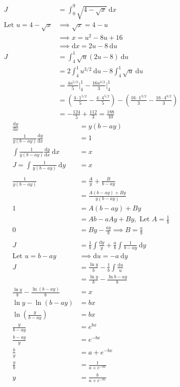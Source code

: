 \documentclass{article}
\theoremstyle{plain}
\theoremstyle{definition}
\newcommand{\dx}{\text{d}}
\begin{document}
\begin{align*}
	J&=\int_0^9 \sqrt{4-\sqrt{x}}\ \text{d}x \\
	\text{Let } u = 4-\sqrt{x} &\implies \sqrt{x} =4-u \\
							   &\implies x = u^2-8u+16 \\
							   &\implies \text{d}x = 2u-8\ \text{d}u\\
	J&= \int_4^1 \sqrt{u}(2u-8)\ \text{d}u \\
	 &= 2\int_4^1 u^{3/2}\ \text{d}u - 8 \int_4^1 \sqrt{u} \ \text{d}u \\
	 &= \frac{4u^{5/2}}{5} \bigg|_4^1- \frac{16u^{3/2}}{3} \bigg|_4^1\\
	 &= \left(\frac{4\cdot 1^{5/2}}{5}-\frac{4\cdot 4^{5/2}}{5}\right)
	-\left(\frac{16\cdot 1^{3/2}}{3}-\frac{16\cdot 4^{3/2}}{3}\right)\\
	&= -\frac{124}{5} + \frac{112}{3} = \frac{188}{10}
\end{align*}
\begin{align*}
	\frac{\dx y}{\dx x} &= y(b-ay) \\
	\frac{1}{y(b-ay)}\frac{\dx y}{\dx x} &= 1 \\
	\int \frac{1}{y(b-ay)}\frac{\dx y}{\dx x}\ \dx x &= x \\
	J=\int \frac{1}{y(b-ay)}\ \dx y &= x \\
	\\
	\frac{1}{y(b-ay)} &= \frac{A}{y}+\frac{B}{b-ay} \\
					  &= \frac{A(b-ay)+By}{y(b-ay)}\\
					1 &= A(b-ay)+By \\
					  &= Ab - aAy+By, \text{ Let } A =\frac{1}{b} \\
					0 &= By-\frac{ay}{b} \implies B = \frac{a}{b} \\
	\\
	J&= \frac{1}{b}\int\frac{\dx y}{y}+\frac{a}{b}\int\frac{1}{b-ay}\ \dx y \\
	\text{Let } u = b-ay &\implies \dx u = -a\ \dx y \\
	J&= \frac{\ln y}{b}-\frac{1}{b}\int\frac{\dx u}{u} \\
	 &= \frac{\ln y}{b}-\frac{\ln b-ay}{b}\\
	\frac{\ln y}{b}-\frac{\ln( b-ay)}{b} &= x \\
	\ln y - \ln (b-ay) &= bx\\
	\ln {\left(\frac{y}{b-ay}\right)} &= bx \\
	\frac{y}{b-ay} &= e^{bx}\\
	\frac{b-ay}{y} &= e^{-bx}\\
	\frac{b}{y} &= a+e^{-bx}\\
	\frac{y}{b} &=\frac{1}{a+e^{-bx}}\\
	y &=\frac{b}{a+e^{-bx}}
\end{align*}
\end{document}

